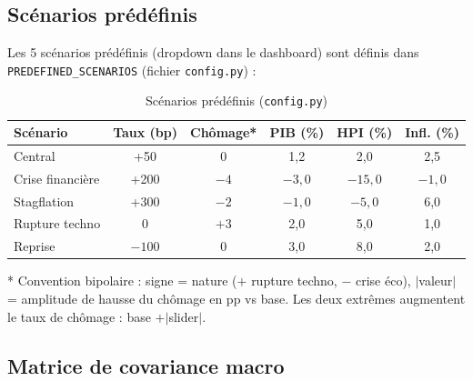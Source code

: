 \documentclass[12pt,a4paper]{article}
\begin{document}
\subsection{Sc\'enarios pr\'ed\'efinis}

Les 5 sc\'enarios pr\'ed\'efinis (dropdown dans le dashboard) sont d\'efinis dans
\texttt{PREDEFINED\_SCENARIOS} (fichier \texttt{config.py}) :

\begin{table}[htbp]
\centering
\caption{Sc\'enarios pr\'ed\'efinis (\texttt{config.py})}
\begin{tabular}{lccccc}
\toprule
\textbf{Sc\'enario} & \textbf{Taux (bp)} & \textbf{Ch\^omage*} & \textbf{PIB (\%)} & \textbf{HPI (\%)} & \textbf{Infl. (\%)} \\
\midrule
Central & +50 & 0 & 1,2 & 2,0 & 2,5 \\
Crise financi\`ere & +200 & $-4$ & $-3{,}0$ & $-15{,}0$ & $-1{,}0$ \\
Stagflation & +300 & $-2$ & $-1{,}0$ & $-5{,}0$ & 6,0 \\
Rupture techno & 0 & $+3$ & 2,0 & 5,0 & 1,0 \\
Reprise & $-100$ & 0 & 3,0 & 8,0 & 2,0 \\
\bottomrule
\end{tabular}

\vspace{0.3cm}
\footnotesize
* Convention bipolaire : signe = nature ($+$ rupture techno, $-$ crise \'eco),
$|$valeur$|$ = amplitude de hausse du ch\^omage en pp vs base.
Les deux extr\^emes augmentent le taux de ch\^omage : base $+ |$slider$|$.
\label{tab:scenarios}
\end{table}

\subsection{Matrice de covariance macro}
\end{document}

